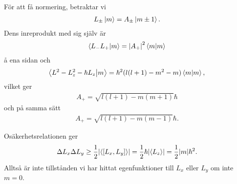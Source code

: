 För att få normering, betraktar vi
\begin{align*}
	L_{\pm}\ket{m} = A_{\pm}\ket{m\pm 1}.
\end{align*}
Dens inreprodukt med sig själv är
\begin{align*}
	\braket{L_{-}L_{+}}{m} = \abs{A_{+}}^{2}\braket{m}
\end{align*}
å ena sidan och
\begin{align*}
	\braket{L^{2} - L_{z}^{2} - \hbar L_{z}}{m} = \hbar^{2}(l(l + 1) - m^{2} - m)\braket{m},
\end{align*}
vilket ger
\begin{align*}
	A_{+} = \sqrt{l(l + 1)- m(m + 1)}\hbar
\end{align*}
och på samma sätt
\begin{align*}
	A_{+} = \sqrt{l(l + 1)- m(m - 1)}\hbar.
\end{align*}

Osäkerhetsrelationen ger
\begin{align*}
	\Delta L_{x}\Delta L_{y} \geq \frac{1}{2}\abs{\expval{[L_{x}, L_{y}]}} = \frac{1}{2}\hbar\abs{\expval{L_{z}}} = \frac{1}{2}\abs{m}\hbar^{2}.
\end{align*}
Alltså är inte tillstånden vi har hittat egenfunktioner till $L_{x}$ eller $L_{y}$ om inte $m = 0$.